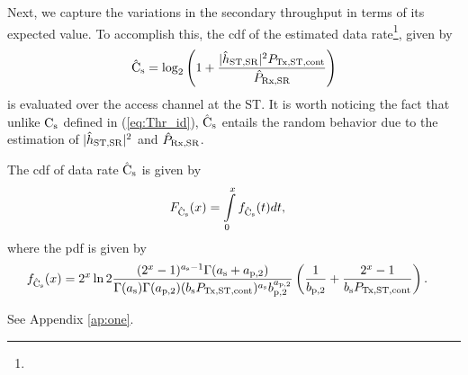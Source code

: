 
Next, we capture the variations in the secondary throughput in terms of its expected value. To accomplish this, the cdf of the estimated data rate\footnote{}, given by  
\begin{align}
\eca  = \log_2 \left(1 + \frac{\epgs \preg}{\eprcvdsr} \right) \label{eq:eca}
\end{align}
is evaluated over the access channel at the ST. It is worth noticing the fact that unlike $\text{C}_{\text{s}}$ defined in (\ref{eq:Thr_id}), $\hat{\text{{C}}}_{\text{s}}$ entails the random behavior due to the estimation of $|\hat{h}_{\text{ST,SR}}|^2$ and $\hat{P}_{\text{Rx,SR}}$.
\begin{lemma} \label{lm:lm5}
\normalfont 
The cdf of data rate $\hat{\text{{C}}}_{\text{s}}$ is given by
\begin{align}
\fc(x) &= \int\limits_{0}^{x} \dc(t) dt, \label{eq:dis_C} 
\end{align}
where the pdf is given by 
\begin{align}
\dc(x) &= 2^x \ln 2 \frac{(2^x - 1)^{\as - 1} \Gamma(\as + \apt)}{\Gamma(\as) \Gamma(\apt) (\bs \preg) ^{\as} \bpt^{\apt}} \left(\frac{1}{\bpt} + \frac{2^x - 1}{\bs \preg}\right). \label{eq:den_C}
\end{align}
\end{lemma}
\begin{IEEEproof}
See Appendix \ref{ap:one}.
\end{IEEEproof}

